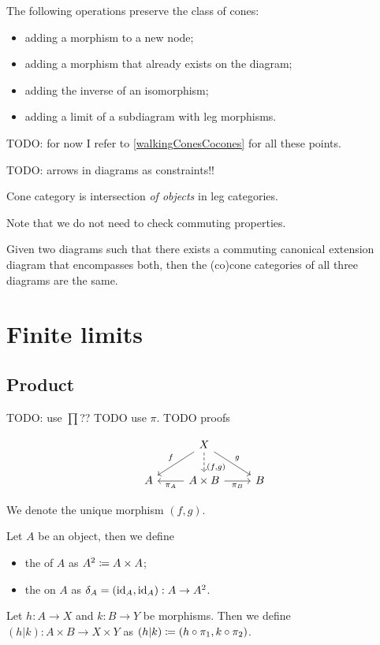 The following operations preserve the class of cones:
\begin{itemize}
\item adding a morphism to a new node;
\item adding a morphism that already exists on the diagram;
\item adding the inverse of an isomorphism;
\item adding a limit of a subdiagram with leg morphisms.
\end{itemize}
TODO: for now I refer to \ref{walkingConesCocones} for all these points.

TODO: arrows in diagrams as constraints!!

\begin{proposition}
Cone category is intersection \emph{of objects} in leg categories.
\end{proposition}
Note that we do not need to check commuting properties.

\begin{corollary}
Given two diagrams such that there exists a commuting canonical extension diagram that encompasses both, then the (co)cone categories of all three diagrams are the same.
\end{corollary}

\section{Finite limits}
\subsection{Product}
TODO: use $\prod$?? TODO use $\pi$. TODO proofs

\[ \begin{tikzcd}
& X \arrow[d, dashed, near end, "{(f,g)}"] \arrow[dl, swap, "f"] \arrow[dr, "g"] & \\
A & A\times B \arrow[l, "{\pi_A}"] \arrow[r, swap, "{\pi_B}"] & B
\end{tikzcd} \]

We denote the unique morphism $(f,g)$.

\begin{definition}
Let $A$ be an object, then we define
\begin{itemize}
\item the  of $A$ as $A^2 \coloneqq A\times A$;
\item the  on $A$ as $\delta_A = (\operatorname{id}_A, \operatorname{id}_A): A\to A^2$.
\end{itemize}
Let $h: A\to X$ and $k: B\to Y$ be morphisms. Then we define $(h|k): A\times B\to X\times Y$ as $(h|k) \coloneqq (h\circ\pi_1, k\circ\pi_2)$.
\end{definition}

